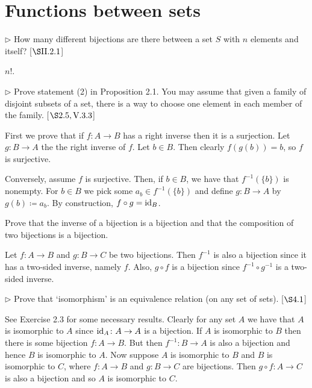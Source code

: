 \section{Functions between sets}
\extitle

\begin{exercise}
	\(\triangleright\) How many different bijections are there between a set \(S\) with \(n\) elements and itself? [\(\S \RNo{2}.2.1\)]
\end{exercise}
\begin{solution}
	$n!$.
\end{solution}

\begin{exercise}
	\(\triangleright\) Prove statement (2) in Proposition 2.1. You may assume that given a family of disjoint subsets of a set, there is a way to choose one element in each member of the family. [\(\S 2.5, \RNo{5}.3.3\)]
\end{exercise}
\begin{solution}
	First we prove that if $f\colon A \to B$ has a right inverse then it is a surjection. Let $g\colon B \to A$ the the right inverse of $f$. Let $b\in B$. Then clearly $f(g(b)) = b$, so $f$ is surjective.
	
	Conversely, assume $f$ is surjective. Then, if $b\in B$, we have that $f^{-1}(\{b\})$ is nonempty. For $b \in B$ we pick some $a_b\in f^{-1}(\{b\})$ and define $g\colon B \to A$ by $g(b)\coloneqq a_b$. By construction, $f\circ g = \textnormal{id}_B$.
\end{solution}

\begin{exercise}
	Prove that the inverse of a bijection is a bijection and that the composition of two bijections is a bijection.
\end{exercise}
\begin{solution}
	Let $f\colon A \to B$ and $g\colon B \to C$ be two bijections. Then $f^{-1}$ is also a bijection since it has a two-sided inverse, namely $f$. Also, $g\circ f$ is a bijection since $f^{-1} \circ g^{-1}$ is a two-sided inverse.
\end{solution}

\begin{exercise}
	\(\triangleright\) Prove that ‘isomorphism’ is an equivalence relation (on any set of sets). [\(\S 4.1\)]
\end{exercise}
\begin{solution}
	See Exercise 2.3 for some necessary results. Clearly for any set $A$ we have that $A$ is isomorphic to $A$ since $\operatorname{id}_A \colon A \to A$ is a bijection. If $A$ is isomorphic to $B$ then there is some bijection $f \colon A \to B$. But then $f^{-1}\colon B \to A$ is also a bijection and hence $B$ is isomorphic to $A$. Now suppose $A$ is isomorphic to $B$ and $B$ is isomorphic to $C$, where $f\colon A \to B$ and $g\colon B \to C$ are bijections. Then $g\circ f\colon A \to C$ is also a bijection and so $A$ is isomorphic to $C$.
\end{solution}

